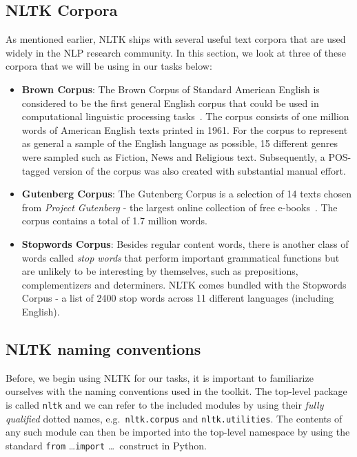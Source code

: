 \documentclass[11pt]{article}
\begin{document}
\subsection{NLTK Corpora}\label{sub:nltk_corpora} %
As mentioned earlier, NLTK ships with several useful text corpora that are used widely in the NLP research community. In this section, we look at three of these corpora that we will be using in our tasks below:
\begin{itemize}
	\item \textbf{Brown Corpus}: The  Brown Corpus of Standard American English is considered to be the first general English corpus that could be used in computational linguistic processing tasks~\cite{brown}. The corpus consists of one million words of American English texts printed in 1961. For the corpus to represent as general a sample of the English language as possible, 15 different genres were sampled such as Fiction, News and Religious text. Subsequently, a POS-tagged version of the corpus was also created with substantial manual effort.
	\item \textbf{Gutenberg Corpus}: The Gutenberg Corpus is a selection of 14 texts chosen from \emph{Project Gutenberg} - the largest online collection of free e-books~\cite{gutenberg}. The corpus contains a total of 1.7 million words.
	\item \textbf{Stopwords Corpus}: Besides regular content words, there is another class of words called \emph{stop words} that perform important grammatical functions but are unlikely to be interesting by themselves, such as prepositions, complementizers and determiners. NLTK comes bundled with the Stopwords Corpus - a list of 2400 stop words across 11 different languages (including English).
\end{itemize}

\subsection{NLTK naming conventions}\label{sub:nltk_naming_conventions} %
Before, we begin using NLTK for our tasks, it is important to familiarize ourselves with the naming conventions used in the toolkit. The top-level package is called \texttt{nltk} and we can refer to the included modules by using their \emph{fully qualified} dotted names, e.g.~\texttt{nltk.corpus} and \texttt{nltk.utilities}. The contents of any such module can then be imported into the top-level namespace by using the standard \lstinline$from$ \dots \lstinline$import$ \dots \ construct in Python.
\end{document}
